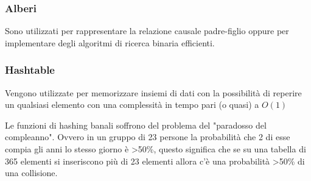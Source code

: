 \subsubsection{Alberi}
Sono utilizzati per rappresentare la relazione causale padre-figlio oppure per implementare degli algoritmi di ricerca binaria efficienti.

\subsubsection{Hashtable}
Vengono utilizzate per memorizzare insiemi di dati con la possibilità di reperire un qualsiasi elemento con una complessità in tempo pari (o quasi) a $O(1)$

\spacer
Le funzioni di hashing banali soffrono del problema del "paradosso del compleanno".
Ovvero in un gruppo di 23 persone la probabilità che 2 di esse compia gli anni lo stesso giorno è >50\%, questo significa che se su una tabella di 365 elementi si inseriscono più di 23 elementi allora c'è una probabilità >50\% di una collisione.
